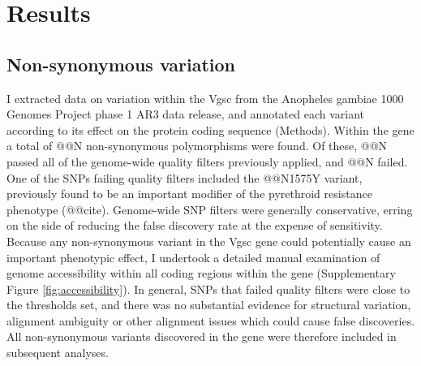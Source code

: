 \documentclass[a4paper,11pt,abstracton,hidelinks]{scrartcl}
\begin{document}
\section*{Results}


\subsection*{Non-synonymous variation}


%
I extracted data on variation within the Vgsc from the Anopheles gambiae 1000 Genomes Project phase 1 AR3 data release, and annotated each variant according to its effect on the protein coding sequence (Methods).
%
Within the gene a total of @@N non-synonymous polymorphisms were found.
%
Of these, @@N passed all of the genome-wide quality filters previously applied, and @@N failed.
%
One of the SNPs failing quality filters included the @@N1575Y variant, previously found to be an important modifier of the pyrethroid resistance phenotype (@@cite).
%
Genome-wide SNP filters were generally conservative, erring on the side of reducing the false discovery rate at the expense of sensitivity.
%
Because any non-synonymous variant in the Vgsc gene could potentially cause an important phenotypic effect, I undertook a detailed manual examination of genome accessibility within all coding regions within the gene (Supplementary Figure \ref{fig:accessibility}).
%
In general, SNPs that failed quality filters were close to the thresholds set, and there was no substantial evidence for structural variation, alignment ambiguity or other alignment issues which could cause false discoveries.
%
All non-synonymous variants discovered in the gene were therefore included in subsequent analyses.
\end{document}
